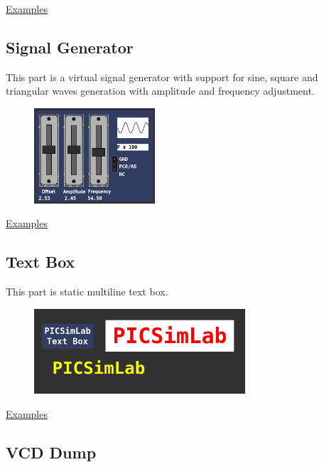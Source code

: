 \href{https://lcgamboa.github.io/picsimlab_examples/parts_IO_Virtual_Term.html}{Examples}

\subsection{Signal Generator}

This part is a virtual signal generator with support for sine, square and triangular waves 
generation with amplitude and frequency adjustment.

\begin{figure}[H]
\center
\includegraphics[width=0.4\textwidth]{img/part_sgen.png} 
\end{figure}

\href{https://lcgamboa.github.io/picsimlab_examples/parts_Signal_Generator.html}{Examples}


\subsection{Text Box}

This part is static multiline text box. 

\begin{figure}[H]
\center
\includegraphics[width=0.7\textwidth]{img/part_text_box.png} 
\end{figure}


\href{https://lcgamboa.github.io/picsimlab_examples/parts_Text_Box.html}{Examples}


\subsection{VCD Dump}

